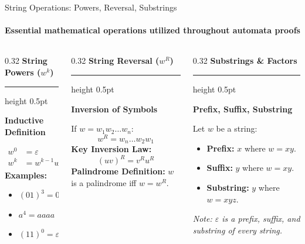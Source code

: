 \documentclass[aspectratio=169, 10pt]{beamer}
\newcommand{\colheader}[1]{%
  {\noindent\footnotesize\bfseries\color{gimpanavy}#1}%
  \vspace{0.02cm}%
  {\color{gimpanavy!30}\hrule height 0.5pt}%
  \vspace{0.05cm}%
}
\newcommand{\cardtitle}[1]{{\noindent\footnotesize\bfseries\color{gimpanavy}#1}\par\vspace{0.03cm}}
\newcommand{\greentitle}[1]{{\noindent\footnotesize\bfseries\color{accentGreen}#1}\par\vspace{0.03cm}}
\begin{document}
\begin{frame}{String Operations: Powers, Reversal, Substrings}
  \framesubtitle{Essential mathematical operations utilized throughout automata proofs}
  
  \begin{columns}[T]
    \begin{column}{0.32\textwidth}
      \colheader{String Powers ($w^k$)}
      \begin{tcolorbox}[conceptcard]
        \cardtitle{Inductive Definition}
        {\scriptsize
        \begin{align*}
          w^0 &= \varepsilon \\
          w^{k} &= w^{k-1} w \quad (k \ge 1)
        \end{align*}
        \textbf{Examples:}
        \begin{itemize}\setlength{\itemsep}{1.5pt}\scriptsize
          \item $(01)^3 = 010101$
          \item $a^4 = aaaa$
          \item $(11)^0 = \varepsilon$
        \end{itemize}
        }
      \end{tcolorbox}
    \end{column}
    
    \begin{column}{0.32\textwidth}
      \colheader{String Reversal ($w^R$)}
      \begin{tcolorbox}[examplecard]
        \greentitle{Inversion of Symbols}
        {\scriptsize
        If $w = w_1 w_2 \dots w_n$:
        \[ w^R = w_n \dots w_2 w_1 \]
        \textbf{Key Inversion Law:}
        \[ (uv)^R = v^R u^R \]
        \textbf{Palindrome Definition:}
        $w$ is a palindrome iff $w = w^R$.
        }
      \end{tcolorbox}
    \end{column}
    
    \begin{column}{0.32\textwidth}
      \colheader{Substrings \& Factors}
      \begin{tcolorbox}[spotlightcard]
        \cardtitle{Prefix, Suffix, Substring}
        {\scriptsize
        Let $w$ be a string:
        \begin{itemize}\setlength{\itemsep}{1.5pt}\scriptsize
          \item \textbf{Prefix:} $x$ where $w = xy$.
          \item \textbf{Suffix:} $y$ where $w = xy$.
          \item \textbf{Substring:} $y$ where $w = xyz$.
        \end{itemize}
        \textit{Note: $\varepsilon$ is a prefix, suffix, and substring of every string.}
        }
      \end{tcolorbox}
    \end{column}
  \end{columns}
  

\end{frame}
\end{document}
